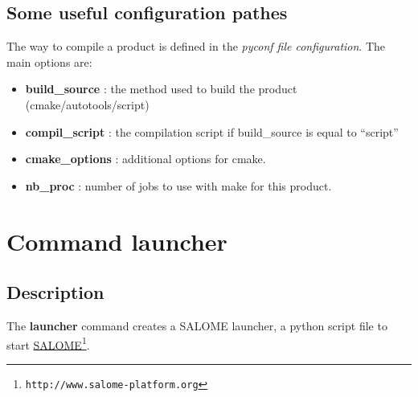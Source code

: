 \documentclass[a4paper,10pt,english]{sphinxmanual}
\begin{document}
\subsection{Some useful configuration pathes}
\label{commands/compile:some-useful-configuration-pathes}
The way to compile a product is defined in the \emph{pyconf file configuration}.
The main options are:
\begin{itemize}
\item {} 
\textbf{build\_source} : the method used to build the product (cmake/autotools/script)

\item {} 
\textbf{compil\_script} : the compilation script if build\_source is equal to ``script''

\item {} 
\textbf{cmake\_options} : additional options for cmake.

\item {} 
\textbf{nb\_proc} : number of jobs to use with make for this product.

\end{itemize}
\clearpage

\section{Command launcher}
\label{commands/launcher:svn}\label{commands/launcher:command-launcher}\label{commands/launcher::doc}

\subsection{Description}
\label{commands/launcher:description}
The \textbf{launcher} command creates a SALOME launcher, a python script file to start \href{http://www.salome-platform.org}{SALOME}\footnote[6]{\sphinxAtStartFootnote%
\nolinkurl{http://www.salome-platform.org}
}.
\end{document}
